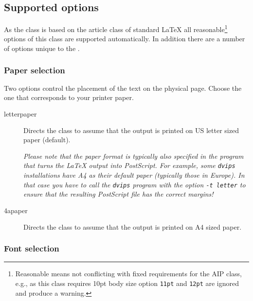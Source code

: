 \subsection{Supported options}\label{suppopt}

As the class is based on the article class of standard \LaTeX{} all
reasonable\footnote{Reasonable means not conflicting with fixed
requirements for the AIP class, e.g., as this class requires 10pt body
size option \texttt{11pt} and \texttt{12pt} are ignored and produce a
warning.} options of this class are supported automatically.
In addition there are a number of options unique to the \aipcls.

\subsubsection{Paper selection}

Two options control the placement of the text on the physical
page. Choose the one that corresponds to your printer paper.
\begin{description}
\item[letterpaper] Directs the class to assume that the output is
printed on US letter sized paper (default).

\emph{Please note that the paper format is typically also specified in
the program that turns the \LaTeX{} output into PostScript. For
example, some \texttt{dvips} installations have A4 as their default
paper (typically those in Europe). In that case you have to call the
\texttt{dvips} program  with the option \texttt{-t letter} to ensure
that the resulting PostScript file has the correct margins!}

\item[4apaper] Directs the class to assume that the output is
printed on A4 sized paper.
\end{description}

\subsubsection{Font selection}

